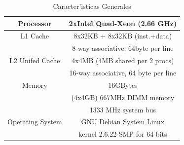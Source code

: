\documentclass[headings=optiontohead,12pt,letterpaper,oneside,spanish]{book}
\begin{document}
   \begin{table}
\begin{center} 
   \caption{\label{tabla_hardware} Caracter'isticas Generales}
   \begin{tabular}{|c|c|}
\hline
   Processor& 2xIntel Quad-Xeon (2.66 GHz)\\
   \hline
   L1 Cache&8x32KB + 8x32KB (inst.+data)\\
   &8-way associative, 64byte per line\\
   \hline
   L2 Unifed Cache&4x4MB (4MB shared per 2 procs)\\
   &16-way associative, 64 byte per line\\
   \hline
   Memory&16GBytes\\
   & (4x4GB) 667MHz DIMM memory\\
   & 1333 MHz system bus\\
   \hline
   Operating System&GNU Debian System Linux\\
   &kernel 2.6.22-SMP for 64 bits\\
   \hline
   \end{tabular}
\end{center}
   \end{table}



\tableofcontents{}

\listoffigures

\listoftables


\mainmatter











%
%




\backmatter



\end{document}
